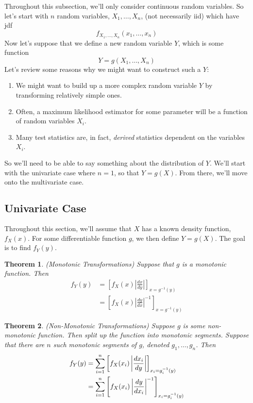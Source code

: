 \documentclass[12pt]{article}
\theoremstyle{plain}
\newtheorem{thm}{Theorem}[section]
\theoremstyle{definition}
\theoremstyle{remark}
\newcommand{\sumin}{\sum^n_{i=1}}
\begin{document}
Throughout this subsection, we'll only consider continuous random
variables. So let's start with $n$ random variables, $X_1, \ldots, X_n$,
(not necessarily iid) which have jdf
   \[ f_{X_1, \ldots, X_n}(x_1, \ldots, x_n) \]
Now let's suppose that we define a new random variable $Y$, which is
some function
   \[ Y = g(X_1, \ldots, X_n) \]
Let's review some reasons why we might want to construct such a $Y$:
\begin{enumerate}
  \item We might want to build up a more complex random variable $Y$
    by transforming relatively simple ones.
  \item Often, a maximum likelihood estimator for some parameter will be
    a function of random variables $X_i$.
  \item Many test statistics are, in fact, \emph{derived} statistics
    dependent on the variables $X_i$.
\end{enumerate}
So we'll need to be able to say something about the distribution of $Y$.
We'll start with the univariate case where $n=1$, so that $Y=g(X)$. From
there, we'll move onto the multivariate case.

\subsection{Univariate Case}

Throughout this section, we'll assume that $X$ has a known density
function, $f_X(x)$. For some differentiable function $g$, we then define
$Y = g(X)$. The goal is to find $f_Y(y)$.

\begin{thm}\emph{(Monotonic Transformations)}
Suppose that $g$ is a monotonic function. Then
\begin{align*}
   f_Y(y) &= \left[f_X(x) \left\lvert \frac{dx}{dy}\right\rvert
      \right]_{x = g^{-1}(y)} \\
    &= \left[ f_X(x) \left\lvert \frac{dy}{dx}\right\rvert^{-1}
      \right]_{x = g^{-1}(y)}
\end{align*}
\end{thm}

\begin{thm}\emph{(Non-Monotonic Transformations)}
Suppose $g$ is some non-monotonic function. Then split up the function
into monotonic segments. Suppose that there are $n$ such monotonic
segments of $g$, denoted $g_1,\ldots,g_n$. Then
\begin{align}
   \label{nonmontrans}
   f_Y(y)
   &= \sumin \left[ f_X(x_i) \left\lvert \frac{dx_i}{dy}
      \right\rvert \right]_{x_i=g_i^{-1}(y)}\\
   &= \sumin \left[ f_X(x_i) \left\lvert \frac{dy}{dx_i}
    \right\rvert^{-1} \right]_{x_i=g_i^{-1}(y)}
    \notag
\end{align}
\end{thm}
\end{document}
